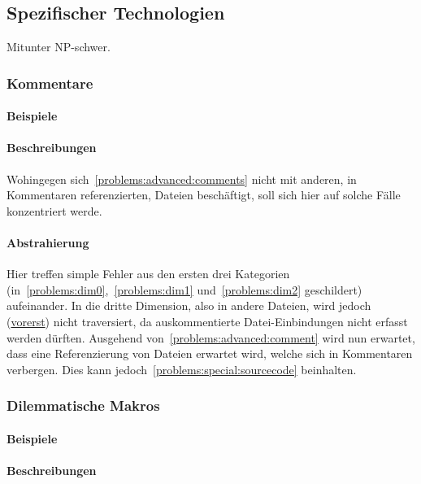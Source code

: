 \subsection{Spezifischer Technologien}\label{problems:special}
Mitunter NP-schwer.
\subsubsection{Kommentare}\label{problems:advanced:comments}
\paragraph*{Beispiele}
\paragraph*{Beschreibungen}
Wohingegen sich~\ref{problems:advanced:comments} nicht mit anderen, in Kommentaren referenzierten, Dateien beschäftigt, soll sich hier auf solche Fälle konzentriert werde.
\paragraph*{Abstrahierung}
Hier treffen simple Fehler aus den ersten drei Kategorien (in~\ref{problems:dim0},~\ref{problems:dim1} und~\ref{problems:dim2} geschildert) aufeinander. In die dritte Dimension, also in andere Dateien, wird jedoch (\hyperref[problems:special:comments]{vorerst}) nicht traversiert, da auskommentierte Datei-Einbindungen nicht erfasst werden dürften. 
Ausgehend von~\ref{problems:advanced:comment} wird nun erwartet, dass eine Referenzierung von Dateien erwartet wird, welche sich in Kommentaren verbergen. Dies kann jedoch~\ref{problems:special:sourcecode} beinhalten.


\subsubsection{Dilemmatische Makros}\label{problems:special:macrodilemma}%
\paragraph*{Beispiele}
\paragraph*{Beschreibungen}
